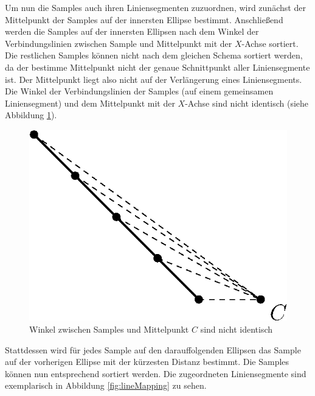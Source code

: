 Um nun die Samples auch ihren Liniensegmenten zuzuordnen, wird zunächst der Mittelpunkt der Samples auf der innersten Ellipse bestimmt. Anschließend werden die Samples auf der innersten Ellipsen nach dem Winkel der Verbindungslinien zwischen Sample und Mittelpunkt mit der $X$-Achse sortiert. 
Die restlichen Samples können nicht nach dem gleichen Schema sortiert werden, da der bestimme Mittelpunkt nicht der genaue Schnittpunkt aller Liniensegmente ist. Der Mittelpunkt liegt also nicht auf der Verlängerung eines Liniensegments. Die Winkel der Verbindungslinien der Samples (auf einem gemeinsamen Liniensegment) und dem Mittelpunkt mit der $X$-Achse sind nicht identisch (siehe Abbildung \ref{fig:sampleMappingProblem}).

\begin{figure}[!htb]
	\centering
	\includegraphics[scale=.9]{images/sampleMappingProblem.eps}
	\caption{Winkel zwischen Samples und Mittelpunkt $C$ sind nicht identisch}
	\label{fig:sampleMappingProblem}
\end{figure}

Stattdessen wird für jedes Sample auf den darauffolgenden Ellipsen das Sample auf der vorherigen Ellipse mit der kürzesten Distanz bestimmt. 
Die Samples können nun entsprechend sortiert werden. Die zugeordneten Liniensegmente sind exemplarisch in Abbildung \ref{fig:lineMapping} zu sehen. 


